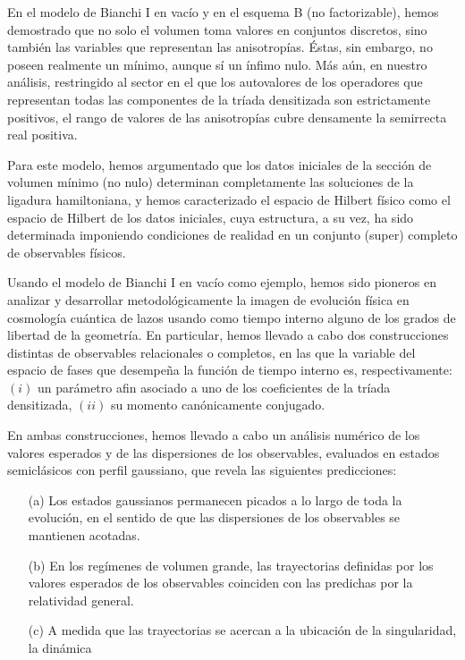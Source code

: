 \begin{list}{}{\leftmargin=1em}
\item En el modelo de Bianchi I en vacío y en el esquema B (no factorizable), hemos demostrado que
no solo el volumen
toma valores en conjuntos discretos, sino también las variables que representan las anisotropías.
Éstas, sin embargo, no poseen realmente un mínimo, aunque sí un ínfimo nulo. Más aún, en nuestro
análisis,
restringido al sector en el que los autovalores de los operadores
que representan todas las componentes de la tríada densitizada son estrictamente positivos, el
rango de valores de las anisotropías cubre densamente la semirrecta real positiva.
\item Para este modelo, hemos argumentado que los datos iniciales de la sección de volumen mínimo
(no nulo) determinan completamente las soluciones de la ligadura hamiltoniana, y hemos
caracterizado el espacio de Hilbert físico como el espacio de Hilbert de los datos iniciales, cuya
estructura, a su vez, ha sido determinada imponiendo
condiciones de realidad en un conjunto (super) completo de observables físicos.
\item Usando el modelo de Bianchi I en vacío como ejemplo, hemos sido pioneros en analizar y
desarrollar metodológicamente la imagen de evolución física en cosmología cuántica de lazos usando
como tiempo interno alguno de los grados de libertad de la geometría. En particular, hemos llevado a
cabo dos construcciones distintas de observables relacionales o completos, en las que la variable
del espacio de fases que desempeña la función de tiempo interno es, respectivamente: $(i)$ un
parámetro afin asociado a uno de los coeficientes de la tríada densitizada, $(ii)$ su momento
canónicamente conjugado.
\item En ambas construcciones, hemos llevado a cabo un análisis numérico de los valores esperados y
de las dispersiones de los observables, evaluados en estados semiclásicos con perfil gaussiano, que
revela las siguientes predicciones:
\begin{itemize}
 \item[(a)] Los estados gaussianos permanecen picados a lo largo de toda la evolución, en el sentido
de que las dispersiones de los observables se mantienen acotadas.
\item[(b)] En los regímenes de volumen grande, las trayectorias definidas por los valores esperados
de los observables coinciden con las predichas por la relatividad general.
\item[(c)] A medida que las trayectorias se acercan a la ubicación de la singularidad, la dinámica

\end{itemize}
\end{list}
